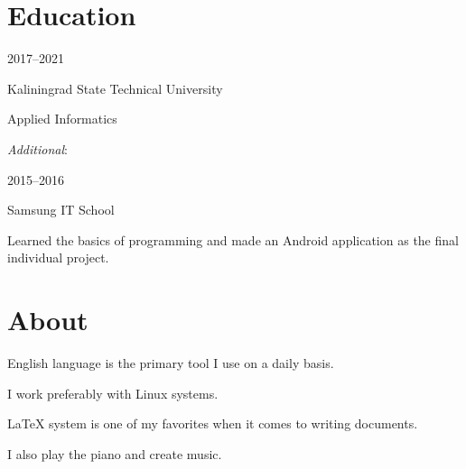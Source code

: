 \documentclass [12pt] {article}
\begin{document}
\section {Education}

2017--2021

Kaliningrad State Technical University

Applied Informatics

\bigskip

\emph {Additional}:

2015--2016

Samsung IT School

Learned the basics of programming and
made an Android application as the final individual project.

\section {About}

English language is the primary tool I use on a daily basis.

I work preferably with Linux systems.

LaTeX system is one of my favorites when it comes to writing documents.

I also play the piano and create music.
\end{document}
